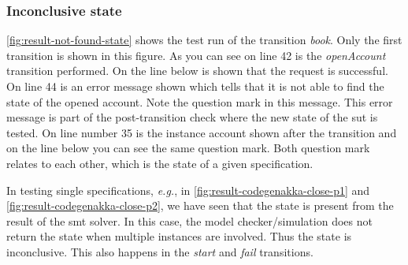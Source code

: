 \subsubsection{Inconclusive state}

\autoref{fig:result-not-found-state} shows the test run of the transition
\textit{book}. Only the first transition is shown in this figure. As you can
see on line 42 is the \textit{openAccount} transition performed. On the line
below is shown that the request is successful. On line 44 is an error message
shown which tells that it is not able to find the state of the opened account.
Note the question mark in this message. This error message is part of the
post-transition check where the new state of the \gls{sut} is tested. On line number
35 is the instance account shown after the transition and on the line below you
can see the same question mark. Both question mark relates to each other, which
is the state of a given specification.

In testing single specifications, \textit{e.g.}, in
\autoref{fig:result-codegenakka-close-p1} and \autoref{fig:result-codegenakka-close-p2},
we have seen that the state is present from the result of the \gls{smt} solver.
In this case, the model checker/simulation does not return the state when
multiple instances are involved. Thus the state is inconclusive.
This also happens in the \textit{start} and \textit{fail} transitions.

